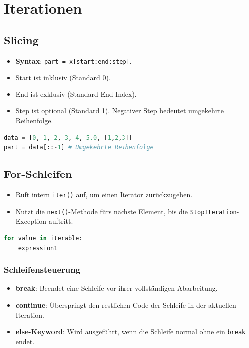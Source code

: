 \section{Iterationen}
\subsection{Slicing}
\begin{itemize}
   \item \textbf{Syntax}: \texttt{part = x[start:end:step]}.
   \item Start ist inklusiv (Standard 0).
   \item End ist exklusiv (Standard End-Index).
   \item Step ist optional (Standard 1). Negativer Step bedeutet umgekehrte Reihenfolge.
\end{itemize}

\begin{lstlisting}[language=Python]
data = [0, 1, 2, 3, 4, 5.0, [1,2,3]]
part = data[::-1] # Umgekehrte Reihenfolge
\end{lstlisting}

\subsection{For-Schleifen}
\begin{itemize}
    \raggedright
    \item Ruft intern \texttt{iter()} auf, um einen Iterator zurückzugeben.
    \item Nutzt die \texttt{next()}-Methode fürs nächste Element, bis die \texttt{StopIteration}-Exception auftritt.
\end{itemize}

\begin{lstlisting}[language=Python]
for value in iterable:
    expression1
\end{lstlisting}

\subsubsection{Schleifensteuerung}
\begin{itemize}
    \item \textbf{break}: Beendet eine Schleife vor ihrer vollständigen Abarbeitung.
    \item \textbf{continue}: Überspringt den restlichen Code der Schleife in der aktuellen Iteration.
    \item \textbf{else-Keyword}: Wird ausgeführt, wenn die Schleife normal ohne ein \texttt{break} endet.
\end{itemize}

